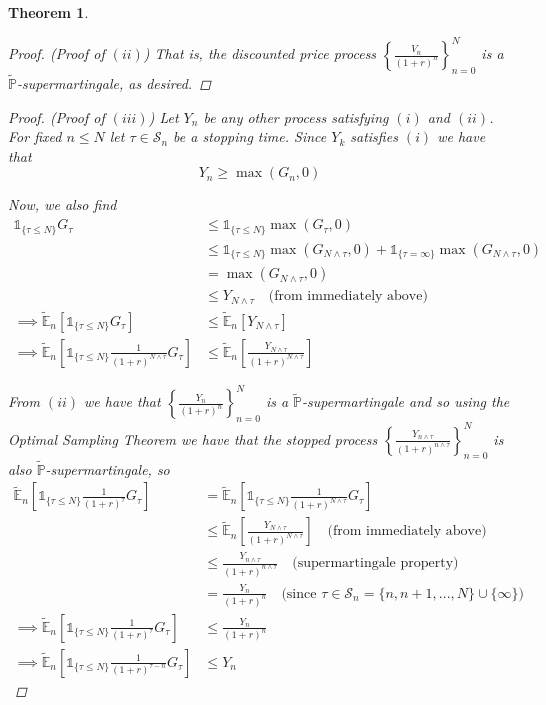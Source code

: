 \documentclass[12pt]{article}
\newtheorem{theorem}{Theorem}
\newlength\tindent
\renewcommand{\indent}{\hspace*{\tindent}}
\renewcommand{\P}{\mathbb P}
\newcommand{\E}{\mathbb E}
\begin{document}
\begin{theorem}
\begin{proof} {\em (Proof of $(ii)$)}
That is, the discounted price process $\left\{ \frac{V_n}{(1 + r)^n} \right\}^N_{n = 0}$ is a $\tilde{\P}$-supermartingale, as desired.
\end{proof}

\begin{proof} {\em (Proof of $(iii)$)} Let $Y_n$ be any other process satisfying $(i)$ and $(ii)$. For fixed $n \leq N$ let $\tau \in \mathcal S_n$ be a stopping time. Since $Y_k$ satisfies $(i)$ we have that
\begin{equation*}
	Y_n \geq \max (G_n, 0) 
\end{equation*}

Now, we also find
\begin{align*}
	\mathds 1_{\{\tau \leq N\}} G_\tau &\leq \mathds 1_{\{\tau \leq N\}} \max(G_\tau, 0) \\
	&\leq \mathds 1_{\{\tau \leq N\}} \max (G_{N \land \tau}, 0) + \mathds 1_{\{\tau = \infty\}}\max (G_{N\land\tau}, 0) \\
	&= \max (G_{N\land \tau},0) \\
	&\leq Y_{N\land \tau} \quad \text{(from immediately above)} \\
	\implies \tilde{\E}_n \left[ \mathds 1_{\{\tau \leq N\}} G_\tau \right] &\leq \tilde{\E}_n \left[ Y_{N\land \tau} \right] \\
	\implies \tilde{\E}_n \left[ \mathds 1_{\{\tau \leq N\}} \frac{1}{(1 + r)^{N\land\tau}} G_\tau \right] &\leq \tilde{\E}_n \left[ \frac{Y_{N\land \tau}}{(1 + r)^{N\land\tau}} \right]
\end{align*}

\indent From $(ii)$ we have that $\left\{ \frac{Y_n}{(1 + r)^n} \right\}^N_{n = 0}$ is a $\tilde{\P}$-supermartingale and so using the Optimal Sampling Theorem we have that the stopped process $\left\{ \frac{Y_{n\land\tau}}{(1 + r)^{n\land\tau}} \right\}^N_{n = 0}$ is also $\tilde{\P}$-supermartingale, so
\begin{align*}
	\tilde{\E}_n \left[ \mathds 1_{\{\tau \leq N\}} \frac{1}{(1 + r)^{\tau}} G_\tau \right] &= \tilde{\E}_n \left[ \mathds 1_{\{\tau \leq N\}} \frac{1}{(1 + r)^{N\land\tau}} G_\tau \right] \\
	&\leq \tilde{\E}_n \left[ \frac{Y_{N\land \tau}}{(1 + r)^{N\land\tau}} \right] \quad \text{(from immediately above)} \\
	&\leq \frac{Y_{n\land\tau}}{(1 + r)^{n\land\tau}} \quad \text{(supermartingale property)} \\
	&= \frac{Y_n}{(1 + r)^n} \quad \text{(since } \tau \in \mathcal S_n = \{n, n + 1,..., N\}\cup\{\infty\}) \\
	\implies \tilde{\E}_n \left[ \mathds 1_{\{\tau \leq N\}} \frac{1}{(1 + r)^{\tau}} G_\tau \right] &\leq \frac{Y_n}{(1 + r)^n} \\
	\implies \tilde{\E}_n \left[ \mathds 1_{\{\tau \leq N\}} \frac{1}{(1 + r)^{\tau - n}} G_\tau \right] &\leq Y_n
\end{align*}


\end{proof}
\end{theorem}
\end{document}
